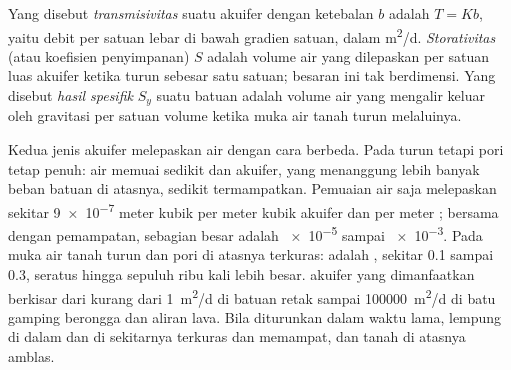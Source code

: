 \begin{definition}\label{def:b3:hydrogeology:storage}
Yang disebut \emph{transmisivitas} suatu akuifer dengan ketebalan
$b$ adalah $T = Kb$, yaitu debit per satuan lebar di bawah gradien satuan, dalam
\unit{m^2/d}. \emph{Storativitas} (atau
koefisien penyimpanan) $S$ adalah volume air yang dilepaskan per satuan luas
akuifer ketika  turun sebesar satu satuan; besaran ini tak berdimensi.
Yang disebut \emph{hasil spesifik} $S_y$ suatu batuan adalah volume
air yang mengalir keluar oleh gravitasi per satuan volume ketika muka
air tanah turun melaluinya.
\end{definition}

Kedua jenis akuifer melepaskan air dengan cara berbeda. Pada 
 turun tetapi pori tetap penuh: air memuai sedikit
dan akuifer, yang menanggung lebih banyak beban batuan di atasnya,
sedikit termampatkan. Pemuaian air saja melepaskan sekitar
\num{9e-7} meter kubik per meter kubik akuifer dan per meter ;
bersama dengan pemampatan,  sebagian besar  adalah
\num{e-5} sampai \num{e-3}. Pada  muka air tanah turun dan
pori di atasnya terkuras:  adalah , sekitar 0.1
sampai 0.3, seratus hingga sepuluh ribu kali lebih besar. 
akuifer yang dimanfaatkan berkisar dari kurang dari \qty{1}{m^2/d} di batuan retak
sampai \qty{100000}{m^2/d} di batu gamping berongga dan aliran lava. Bila
  diturunkan dalam waktu lama, lempung di dalam dan
di sekitarnya terkuras dan memampat, dan tanah di atasnya amblas.

